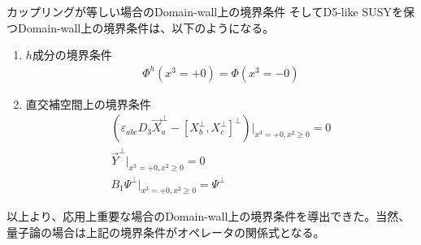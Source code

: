 \documentclass[dvipdfmx,a4paper,10.5pt]{article}
\numberwithin{equation}{section}
\begin{document}
\begin{enumerate}
\begin{resultbox}{カップリングが等しい場合のDomain-wall上の境界条件}
    そしてD5-like SUSYを保つDomain-wall上の境界条件は、以下のようになる。
    \begin{enumerate}
        \item $h$成分の境界条件
        \begin{align*}
            \Phi^{h}(x^{3}=+0)=\Phi(x^{3}=-0)
        \end{align*}
        \item 直交補空間上の境界条件
        \begin{gather*}
            (\varepsilon_{abc}D_{3}\vec{X}_{a}^{\perp}-[X_{b}^{\perp},X_{c}^{\perp}]^{\perp})|_{x^{3}=+0,x^{2}\geq 0}=0\\
            \vec{Y}^{\perp}|_{x^{3}=+0,x^{2}\geq 0}=0\\
            B_{1}\Psi^{\perp}|_{x^{3}=+0,x^{2}\geq 0}=\Psi^{\perp}
        \end{gather*}
    \end{enumerate}   
\end{resultbox}
\end{enumerate}
以上より、応用上重要な場合のDomain-wall上の境界条件を導出できた。当然、量子論の場合は上記の境界条件がオペレータの関係式となる。
\end{document}
